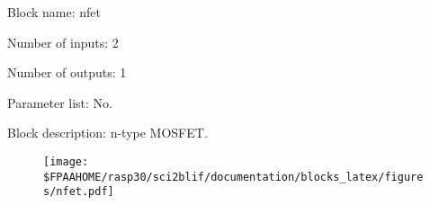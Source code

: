 \pagebreak
Block name: nfet

Number of inputs: 2

Number of outputs: 1

Parameter list: No.

Block description: 
n-type MOSFET.

\begin{figure}[H]  %
\texttt{[image: \$FPAAHOME/rasp30/sci2blif/documentation/blocks\_latex/figures/nfet.pdf]}
\end{figure}

